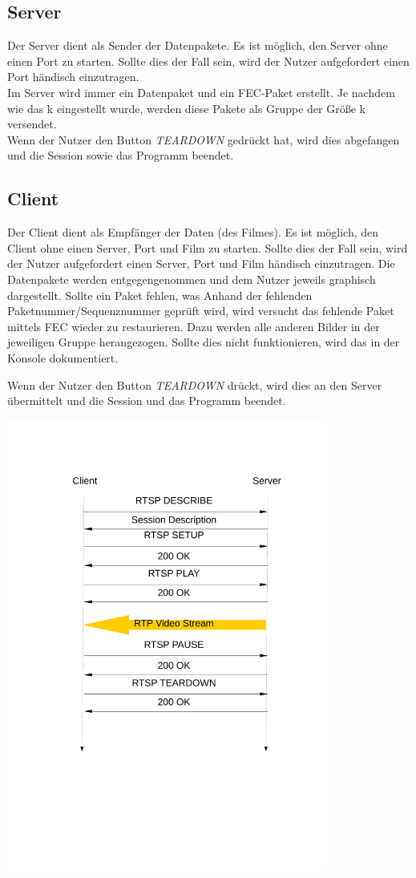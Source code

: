 \documentclass{scrartcl}
\newcommand{\ret}{$  $\\}
\begin{document}
\subsection{Server}
Der Server dient als Sender der Datenpakete. Es ist möglich, den Server ohne einen Port zu starten. Sollte dies der Fall sein, wird der Nutzer aufgefordert einen Port händisch einzutragen. \ret
Im Server wird immer ein Datenpaket und ein FEC-Paket erstellt. Je nachdem wie das k eingestellt wurde, werden diese Pakete als Gruppe der Größe k versendet. \ret
Wenn der Nutzer den Button \emph{TEARDOWN} gedrückt hat, wird dies abgefangen und die Session sowie das Programm beendet.


\subsection{Client}
Der Client dient als Empfänger der Daten (des Filmes). Es ist möglich, den Client ohne einen Server, Port und Film zu starten. Sollte dies der Fall sein, wird der Nutzer aufgefordert einen Server, Port und Film händisch einzutragen.
Die Datenpakete werden entgegengenommen und dem Nutzer jeweils graphisch dargestellt. Sollte ein Paket fehlen, was Anhand der fehlenden Paketnummer/Sequenznummer geprüft wird, wird versucht das fehlende Paket mittels FEC wieder zu restaurieren. Dazu werden alle anderen Bilder in der jeweiligen Gruppe herangezogen. Sollte dies nicht funktionieren, wird das in der Konsole dokumentiert.
\begin{minipage}{0.49\textwidth}
	Wenn der Nutzer den Button \emph{TEARDOWN} drückt, wird dies an den Server übermittelt und die Session und das Programm beendet.  
\end{minipage}
\begin{minipage}{0.49\textwidth}
	\includegraphics[trim={0cm 0cm 0cm 0cm},clip,width=0.79\textwidth]{handshake01.pdf}
\end{minipage}
\end{document}
